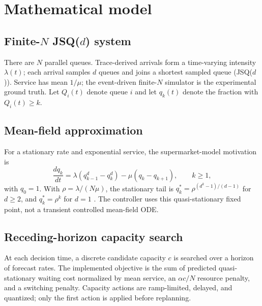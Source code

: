 \documentclass[10pt]{article}
\begin{document}
\section{Mathematical model}
\subsection{Finite-$N$ JSQ($d$) system}
There are $N$ parallel queues. Trace-derived arrivals form a time-varying intensity $\lambda(t)$; each arrival samples $d$ queues and joins a shortest sampled queue (JSQ($d$)). Service has mean $1/\mu$; the event-driven finite-$N$ simulator is the experimental ground truth. Let $Q_i(t)$ denote queue $i$ and let $q_k(t)$ denote the fraction with $Q_i(t)\ge k$.
\subsection{Mean-field approximation}
For a stationary rate and exponential service, the supermarket-model motivation is
\begin{equation}
\frac{d q_k}{dt}=\lambda\left(q_{k-1}^d-q_k^d\right)-\mu\left(q_k-q_{k+1}\right),\qquad k\ge1,
\end{equation}
with $q_0=1$. With $\rho=\lambda/(N\mu)$, the stationary tail is $q_k^*=\rho^{(d^k-1)/(d-1)}$ for $d\ge2$, and $q_k^*=\rho^k$ for $d=1$ \cite{mitzenmacher2001,ying2016}. The controller uses this quasi-stationary fixed point, not a transient controlled mean-field ODE.
\subsection{Receding-horizon capacity search}
At each decision time, a discrete candidate capacity $c$ is searched over a horizon of forecast rates. The implemented objective is the sum of predicted quasi-stationary waiting cost normalized by mean service, an $\alpha c/N$ resource penalty, and a switching penalty. Capacity actions are ramp-limited, delayed, and quantized; only the first action is applied before replanning.
\end{document}
